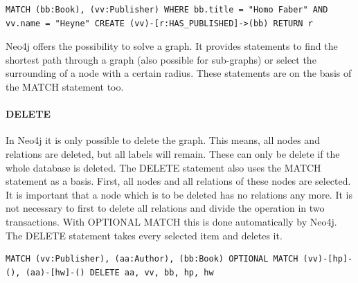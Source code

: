\begin{lstlisting}[language={Cypher}, caption={Match and Create Relation}, label={relation_match}]
MATCH (bb:Book), (vv:Publisher) WHERE bb.title = "Homo Faber" AND vv.name = "Heyne" CREATE (vv)-[r:HAS_PUBLISHED]->(bb) RETURN r
\end{lstlisting}

Neo4j offers the possibility to solve a graph. It provides statements to find the shortest path through a graph (also possible for sub-graphs) or select the surrounding of a node with a certain radius. These statements are on the basis of the MATCH statement too.

\paragraph{DELETE}
In Neo4j it is only possible to delete the graph. This means, all nodes and relations are deleted, but all labels will remain. These can only be delete if the whole database is deleted. The DELETE statement also uses the MATCH statement as a basis. First, all nodes and all relations of these nodes are selected. It is important that a node which is to be deleted has no relations any more. It is not necessary to first to delete all relations and divide the operation in two transactions. With OPTIONAL MATCH this is done automatically by Neo4j. The DELETE statement takes every selected item and deletes it.

\begin{lstlisting}[language={Cypher}, caption={Delete Graph}, label={delete}]
MATCH (vv:Publisher), (aa:Author), (bb:Book) OPTIONAL MATCH (vv)-[hp]-(), (aa)-[hw]-() DELETE aa, vv, bb, hp, hw
\end{lstlisting}